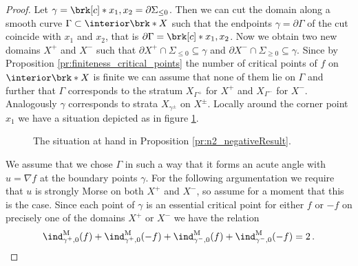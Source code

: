 \begin{proof}
  Let $\gamma=\brk[c]*{x_1,x_2}=\partial\Sigma_{\leq0}$.
  Then we can cut the domain along a smooth curve $\Gamma\subset\interior\brk*{X}$ such that the endpoints $\gamma=\partial\Gamma$
  of the cut coincide with $x_1$ and $x_2$, that is $\partial\Gamma=\brk[c]*{x_1,x_2}$.
  Now we obtain two new domains $X^+$ and $X^-$ such that $\partial X^+\cap\Sigma_{\leq0}\subseteq\gamma$ and
  $\partial X^-\cap\Sigma_{\geq0}\subseteq\gamma$.
  Since by Proposition \ref{pr:finiteness_critical_points} the number of critical points of $f$ on $\interior\brk*{X}$ is finite we can assume that none of them lie on $\Gamma$ and further that $\Gamma$ corresponds to the stratum 
  $X_{\Gamma^+}$ for $X^+$ and $X_{\Gamma^-}$ for $X^-$.
  Analogously $\gamma$ corresponds to strata $X_{\gamma^\pm}$ on $X^\pm$.
  Locally around the corner point $x_1$ we have a situation depicted as in figure \ref{fi:n2_cutOmega_flowthrough}.
  \begin{figure} 
    \centering
    
    \caption{The situation at hand in Proposition \ref{pr:n2_negativeResult}.}
    \label{fi:n2_cutOmega_flowthrough}
  \end{figure}
  We assume that we chose $\Gamma$ in such a way that it forms an acute angle with $u=\nabla f$ at the boundary points $\gamma$.
  For the following argumentation we require that $u$ is strongly Morse on both $X^+$ and $X^-$, so assume for a moment that this
  is the case.
  Since each point of $\gamma$ is an essential critical point for either $f$ or $-f$ on precisely one of the domains $X^+$ or $X^-$ we have
  the relation
  \begin{align}
    \ind^\text{M}_{\gamma^+,0}(f)+\ind^\text{M}_{\gamma^+,0}(-f)+\ind^\text{M}_{\gamma^-,0}(f)+\ind^\text{M}_{\gamma^-,0}(-f)=2\,.\label{eq:n2_disproof_morse_relgamma}

\end{align}
\end{proof}

